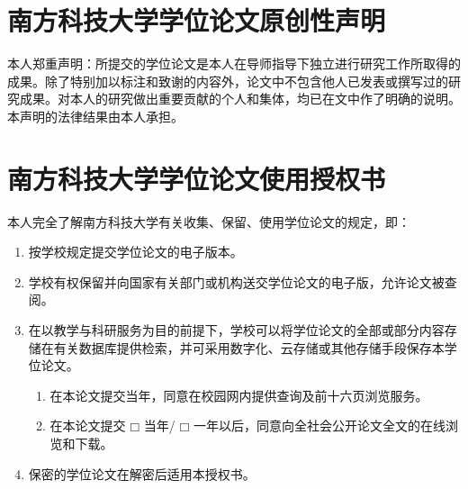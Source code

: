 \begin{statementcopyright}
  \section*{南方科技大学学位论文原创性声明}
  \vspace{1em}

  \begin{spacing}{1.25}
    本人郑重声明：所提交的学位论文是本人在导师指导下独立进行研究工作所取得的成果。除了特别加以标注和致谢的内容外，论文中不包含他人已发表或撰写过的研究成果。对本人的研究做出重要贡献的个人和集体，均已在文中作了明确的说明。本声明的法律结果由本人承担。
  \end{spacing}

  \authorsign

  \section*{南方科技大学学位论文使用授权书}
  \vspace{1em}

  \begin{spacing}{1.25}
    本人完全了解南方科技大学有关收集、保留、使用学位论文的规定，即：

    \begin{enumerate}[wide]
      \item 按学校规定提交学位论文的电子版本。
      \item 学校有权保留并向国家有关部门或机构送交学位论文的电子版，允许论文被查阅。
      \item 在以教学与科研服务为目的前提下，学校可以将学位论文的全部或部分内容存储在有关数据库提供检索，并可采用数字化、云存储或其他存储手段保存本学位论文。
        \begin{enumerate}[wide,label={(\arabic*)}]
          \item 在本论文提交当年，同意在校园网内提供查询及前十六页浏览服务。
          \item 在本论文提交 $\mdlgwhtsquare$ 当年/ $\mdlgwhtsquare$ 一年以后，同意向全社会公开论文全文的在线浏览和下载。
        \end{enumerate}
      \item 保密的学位论文在解密后适用本授权书。
    \end{enumerate}
  \end{spacing}

  \authorsupervisorsign

\end{statementcopyright}